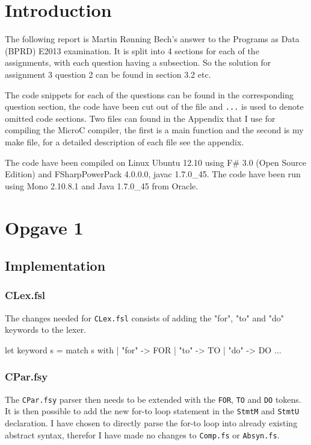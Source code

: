 \section*{Introduction}
The following report is Martin Rønning Bech's answer to the Programs as Data
(BPRD) E2013 examination. It is split into 4 sections for each of the
assignments, with each question having a subsection. So the solution for
assignment 3 question 2 can be found in section 3.2 etc.

The code snippets for each of the questions can be found in the corresponding
question section, the code have been cut out of the file and \texttt{...} is
used to denote omitted code sections. Two files can found in the Appendix that I
use for compiling the MicroC compiler, the first is a main function and the
second is my make file, for a detailed description of each file see the
appendix.

The code have been compiled on Linux Ubuntu 12.10 using F\# 3.0 (Open
Source Edition) and FSharpPowerPack 4.0.0.0, javac 1.7.0\_45. The
code have been run using Mono 2.10.8.1 and Java 1.7.0\_45 from Oracle.

\tableofcontents
\pagebreak


\section{Opgave 1}
\subsection{Implementation}
\subsubsection*{CLex.fsl}
The changes needed for \texttt{CLex.fsl} consists of adding the "for", "to" and "do"
keywords to the lexer.
\begin{ccode}
let keyword s =
    match s with
    | "for"     -> FOR
    | "to"      -> TO
    | "do"      -> DO
    ...
\end{ccode}
\subsubsection*{CPar.fsy}
The \texttt{CPar.fsy} parser then needs to be extended with the \texttt{FOR},
\texttt{TO} and \texttt{DO} tokens. It is then possible to add the new for-to
loop statement in the \texttt{StmtM} and \texttt{StmtU} declaration. I have
chosen to directly parse the for-to loop into already existing abstract syntax,
therefor I have made no changes to \texttt{Comp.fs} or \texttt{Absyn.fs}.

